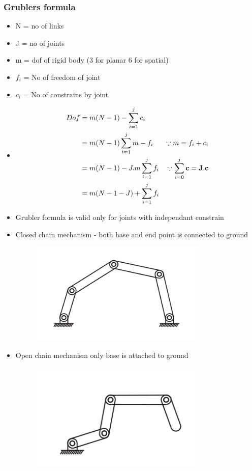 \documentclass[a4paper]{article}
\begin{document}
\subsubsection{Grublers formula}
\begin{itemize}
	\item N = no of links
	\item J = no of joints
	\item m = dof of rigid body (3 for planar 6 for spatial)
	\item $f_i$ = No of freedom of joint
	\item $c_i$ = No of constrains by joint
	\item \begin{align*}
		      Dof & = m(N-1) - \sum_{i=1}^j c_i                                          \\
		          & = m(N-1) \sum_{i=1}^j m-f_i     & \because m = f_i + c_i             \\
		          & = m(N-1) - J.m \sum_{i=1}^j f_i & \because \sum_{i=0}^j \bf{c} = J.c \\
		          & = m(N-1-J) + \sum_{i=1}^j f_i
	      \end{align*}
	\item Grubler formula is valid only for joints with independant constrain
	\item Closed chain mechanism - both base and end point is connected to ground
	      \begin{figure}[H]
		      \centering
		      \includegraphics[width=0.8\textwidth]{closedchain.png}
		      \caption{}
		      \label{fig:}
	      \end{figure}
	\item Open chain mechanism only base is attached to ground
	      \begin{figure}[H]
		      \centering
		      \includegraphics[width=0.8\textwidth]{openchain.png}
		      \caption{}
		      \label{fig:}
	      \end{figure}
\end{itemize}
\end{document}
